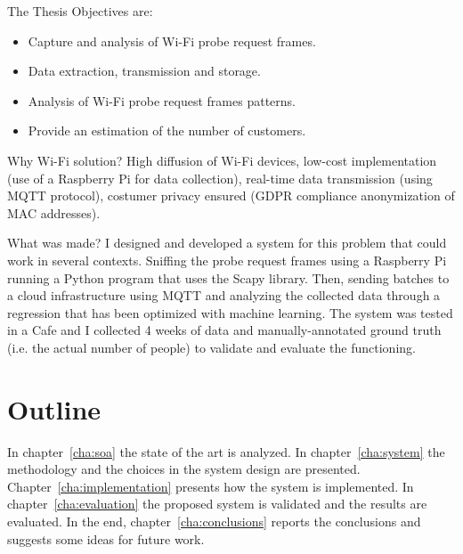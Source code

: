 The Thesis Objectives are:
\begin{itemize}
  \item Capture and analysis of Wi-Fi probe request frames.
  \item Data extraction, transmission and storage.
  \item Analysis of Wi-Fi probe request frames patterns.
  \item Provide an estimation of the number of customers.
\end{itemize}

Why Wi-Fi solution?
High diffusion of Wi-Fi devices, low-cost implementation (use of a Raspberry Pi for data collection), real-time data transmission (using MQTT protocol), costumer privacy ensured (GDPR compliance anonymization of MAC addresses).

What was made?
I designed and developed a system for this problem that could work in several contexts.
Sniffing the probe request frames using a Raspberry Pi running a Python program that uses the Scapy library. Then, sending batches to a cloud infrastructure using MQTT and analyzing the collected data through a regression that has been optimized with machine learning.
The system was tested in a Cafe and I collected 4 weeks of data and manually-annotated ground truth (i.e. the actual number of people) to validate and evaluate the functioning.


\section{Outline} 
\label{sec:outline}
\vspace{0.2 cm} 

In chapter~\ref{cha:soa} the state of the art is analyzed.
In chapter~\ref{cha:system} the methodology and the choices in the system design are presented.
Chapter~\ref{cha:implementation}  presents how the system is implemented.
In chapter~\ref{cha:evaluation} the proposed system is validated and the results are evaluated.
In the end, chapter~\ref{cha:conclusions} reports the conclusions and suggests some ideas for future work.
